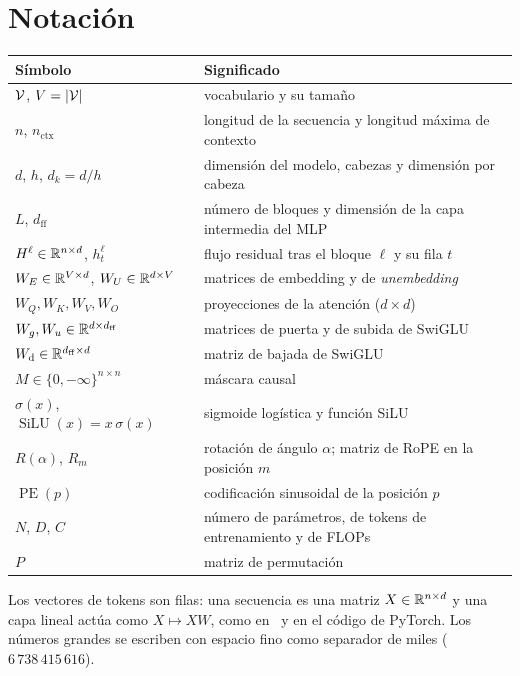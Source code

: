 \documentclass[11pt,a4paper,twoside,openany]{book}
\newcommand{\SiLU}{\operatorname{SiLU}}
\newcommand{\PE}{\operatorname{PE}}
\newcommand{\dff}{d_{\mathrm{ff}}}
\newcommand{\nctx}{n_{\mathrm{ctx}}}
\newcommand{\Wdown}{W_{\mathrm{d}}}
\begin{document}
\section*{Notación}
\begin{center}
\begin{tabular}{@{}ll@{}}
\toprule
Símbolo & Significado \\
\midrule
$\mathcal{V}$, $V=\lvert\mathcal{V}\rvert$ & vocabulario y su tamaño \\
$n$, $\nctx$ & longitud de la secuencia y longitud máxima de contexto \\
$d$, $h$, $d_k=d/h$ & dimensión del modelo, cabezas y dimensión por cabeza \\
$L$, $\dff$ & número de bloques y dimensión de la capa intermedia del MLP \\
$H^{\ell}\in\mathbb{R}^{n\times d}$, $h^{\ell}_t$ & flujo residual tras el bloque $\ell$ y su fila $t$ \\
$W_E\in\mathbb{R}^{V\times d}$, $W_U\in\mathbb{R}^{d\times V}$ & matrices de embedding y de \emph{unembedding} \\
$W_Q,W_K,W_V,W_O$ & proyecciones de la atención ($d\times d$) \\
$W_g,W_u\in\R^{d\times\dff}$ & matrices de puerta y de subida de SwiGLU \\
$\Wdown\in\R^{\dff\times d}$ & matriz de bajada de SwiGLU \\
$M\in\{0,-\infty\}^{n\times n}$ & máscara causal \\
$\sigma(x)$, $\SiLU(x)=x\,\sigma(x)$ & sigmoide logística y función SiLU \\
$R(\alpha)$, $R_m$ & rotación de ángulo $\alpha$; matriz de RoPE en la posición $m$ \\
$\PE(p)$ & codificación sinusoidal de la posición $p$ \\
$N$, $D$, $C$ & número de parámetros, de tokens de entrenamiento y de FLOPs \\
$P$ & matriz de permutación \\
\bottomrule
\end{tabular}
\end{center}

Los vectores de tokens son filas: una secuencia es una matriz $X\in\mathbb{R}^{n\times d}$ y una capa lineal actúa como $X\mapsto XW$, como en~\cite{jm3} y en el código de PyTorch. Los números grandes se escriben con espacio fino como separador de miles ($6\,738\,415\,616$).


\tableofcontents

\mainmatter







\backmatter

\end{document}
